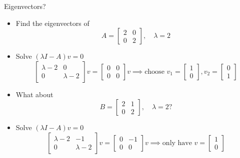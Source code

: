 \documentclass[10pt]{beamer}
\begin{document}
\begin{frame}{Eigenvectors?}
\begin{itemize}
    \item Find the eigenvectors of 
    $$A = \begin{bmatrix}
        2 & 0\\ 0 & 2
    \end{bmatrix}, \quad \lambda = 2$$
    \item Solve $(\lambda I- A)v=0$
    $$
        \begin{bmatrix}
            \lambda - 2& 0 \\ 0 & \lambda-2
        \end{bmatrix}v = \begin{bmatrix}
            0 & 0 \\
            0 & 0
        \end{bmatrix} v \implies \text{choose } v_1 =\begin{bmatrix}
            1\\0
        \end{bmatrix}, v_2=\begin{bmatrix}
            0\\1
        \end{bmatrix}
     $$
    \item<2> What about 
    $$B = \begin{bmatrix}
        2 & 1\\ 0 & 2
    \end{bmatrix},\quad \lambda=2?$$
    \item<2> Solve $(\lambda I- A)v=0$
    $$
        \begin{bmatrix}
            \lambda - 2& -1 \\ 0 & \lambda-2
        \end{bmatrix}v = \begin{bmatrix}
            0 & -1 \\
            0 & 0
        \end{bmatrix} v \implies \text{only have } v =\begin{bmatrix}
            1\\0
        \end{bmatrix}
     $$
\end{itemize}
\end{frame}
\end{document}
